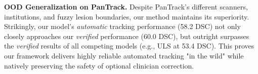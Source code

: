 
\noindent\textbf{OOD Generalization on PanTrack.} Despite PanTrack's different scanners, institutions, and fuzzy lesion boundaries, our method maintains its superiority. Strikingly, our model's \textit{automatic} tracking performance (58.2 DSC) not only closely approaches our \textit{verified} performance (60.0 DSC), but outright surpasses the \textit{verified} results of all competing models (e.g., ULS at 53.4 DSC). This proves our framework delivers highly reliable automated tracking "in the wild" while natively preserving the safety of optional clinician correction.